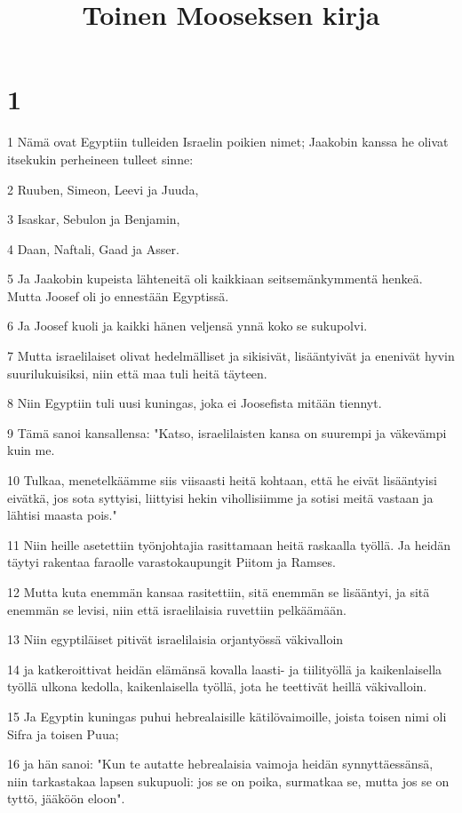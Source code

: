 

\title{Toinen Mooseksen kirja}


\chapter{1}

\par 1 Nämä ovat Egyptiin tulleiden Israelin poikien nimet; Jaakobin kanssa he olivat itsekukin perheineen tulleet sinne:
\par 2 Ruuben, Simeon, Leevi ja Juuda,
\par 3 Isaskar, Sebulon ja Benjamin,
\par 4 Daan, Naftali, Gaad ja Asser.
\par 5 Ja Jaakobin kupeista lähteneitä oli kaikkiaan seitsemänkymmentä henkeä. Mutta Joosef oli jo ennestään Egyptissä.
\par 6 Ja Joosef kuoli ja kaikki hänen veljensä ynnä koko se sukupolvi.
\par 7 Mutta israelilaiset olivat hedelmälliset ja sikisivät, lisääntyivät ja enenivät hyvin suurilukuisiksi, niin että maa tuli heitä täyteen.
\par 8 Niin Egyptiin tuli uusi kuningas, joka ei Joosefista mitään tiennyt.
\par 9 Tämä sanoi kansallensa: "Katso, israelilaisten kansa on suurempi ja väkevämpi kuin me.
\par 10 Tulkaa, menetelkäämme siis viisaasti heitä kohtaan, että he eivät lisääntyisi eivätkä, jos sota syttyisi, liittyisi hekin vihollisiimme ja sotisi meitä vastaan ja lähtisi maasta pois."
\par 11 Niin heille asetettiin työnjohtajia rasittamaan heitä raskaalla työllä. Ja heidän täytyi rakentaa faraolle varastokaupungit Piitom ja Ramses.
\par 12 Mutta kuta enemmän kansaa rasitettiin, sitä enemmän se lisääntyi, ja sitä enemmän se levisi, niin että israelilaisia ruvettiin pelkäämään.
\par 13 Niin egyptiläiset pitivät israelilaisia orjantyössä väkivalloin
\par 14 ja katkeroittivat heidän elämänsä kovalla laasti- ja tiilityöllä ja kaikenlaisella työllä ulkona kedolla, kaikenlaisella työllä, jota he teettivät heillä väkivalloin.
\par 15 Ja Egyptin kuningas puhui hebrealaisille kätilövaimoille, joista toisen nimi oli Sifra ja toisen Puua;
\par 16 ja hän sanoi: "Kun te autatte hebrealaisia vaimoja heidän synnyttäessänsä, niin tarkastakaa lapsen sukupuoli: jos se on poika, surmatkaa se, mutta jos se on tyttö, jääköön eloon".
